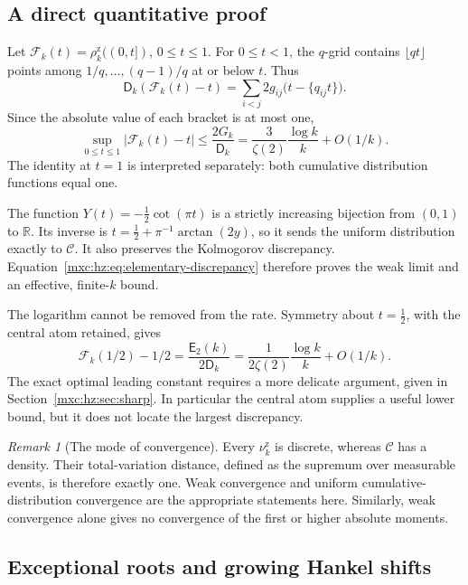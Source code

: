 \documentclass[11pt]{article}
\numberwithin{equation}{section}
\theoremstyle{definition}
\theoremstyle{remark}
\newtheorem{remark}[theorem]{Remark}
\newcommand{\hzrho}{\rho^{\mathrm z}}
\newcommand{\hznu}{\nu^{\mathrm z}}
\newcommand{\Cau}{\mathcal C}
\begin{document}
\subsection{A direct quantitative proof}

Let $\mathcal F_k(t)=\hzrho_k((0,t])$, $0\le t\le1$. For $0\le t<1$, the
$q$-grid contains $\lfloor qt\rfloor$ points among $1/q,\ldots,(q-1)/q$ at
or below $t$. Thus
\begin{equation}\label{mxc:hz:eq:cdf-exact}
 \mathsf D_k(\mathcal F_k(t)-t)
 =\sum_{i<j}2g_{ij}\bigl(t-\{q_{ij}t\}\bigr).
\end{equation}
Since the absolute value of each bracket is at most one,
\begin{equation}\label{mxc:hz:eq:elementary-discrepancy}
 \sup_{0\le t\le1}|\mathcal F_k(t)-t|
 \le\frac{2G_k}{\mathsf D_k}
 =\frac3{\zeta(2)}\frac{\log k}{k}+O(1/k).
\end{equation}
The identity at $t=1$ is interpreted separately: both cumulative
distribution functions equal one.

The function $Y(t)=-\frac12\cot(\pi t)$ is a strictly increasing bijection
from $(0,1)$ to $\mathbb R$. Its inverse is $t=\frac12+\pi^{-1}\arctan(2y)$,
so it sends the uniform distribution exactly to $\Cau$. It also preserves
the Kolmogorov discrepancy.
Equation~\eqref{mxc:hz:eq:elementary-discrepancy} therefore proves the
weak limit and an effective, finite-$k$ bound.

The logarithm cannot be removed from the rate. Symmetry about $t=\frac12$,
with the central atom retained, gives
\[
 \mathcal F_k(1/2)-1/2=\frac{\mathsf E_2(k)}{2\mathsf D_k}
 =\frac1{2\zeta(2)}\frac{\log k}{k}+O(1/k).
\]
The exact optimal leading constant requires a more delicate argument,
given in Section~\ref{mxc:hz:sec:sharp}. In particular the central atom
supplies a useful lower bound, but it does not locate the largest
discrepancy.

\begin{remark}[The mode of convergence]\label{mxc:hz:rem:mode}
Every $\hznu_k$ is discrete, whereas $\Cau$ has a density. Their
total-variation distance, defined as the supremum over measurable events,
is therefore exactly one. Weak convergence and uniform
cumulative-distribution convergence are the appropriate statements here.
Similarly, weak convergence alone gives no convergence of the first or
higher absolute moments.
\end{remark}

\subsection{Exceptional roots and growing Hankel shifts}
\end{document}
